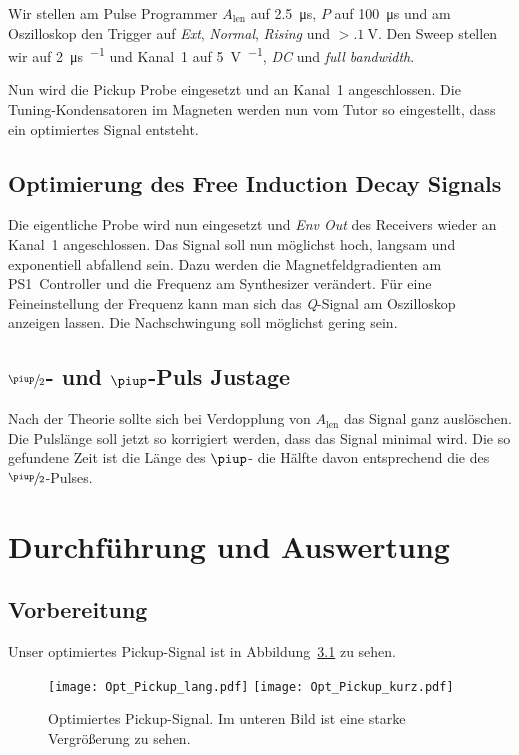 Wir stellen am Pulse Programmer $A_\text{len}$ auf \SI{2.5}{\micro\second}, $P$
auf \SI{100}{\micro\second} und am Oszilloskop den Trigger auf \emph{Ext},
\emph{Normal}, \emph{Rising} und $> \SI{.1}{\volt}$. Den Sweep stellen wir auf
\SI{2}{\micro\second\per\division} und Kanal~1 auf \SI{5}{\volt\per\division},
\emph{DC} und \emph{full bandwidth}.

Nun wird die Pickup Probe eingesetzt und an Kanal~1 angeschlossen. Die
Tuning-Kondensatoren im Magneten werden nun vom Tutor so eingestellt, dass ein
optimiertes Signal entsteht.

\section{Optimierung des Free Induction Decay Signals}

Die eigentliche Probe wird nun eingesetzt und \emph{Env Out} des Receivers
wieder an Kanal~1 angeschlossen. Das Signal soll nun möglichst hoch, langsam
und exponentiell abfallend sein. Dazu werden die Magnetfeldgradienten am
PS1~Controller und die Frequenz am Synthesizer verändert. Für eine
Feineinstellung der Frequenz kann man sich das \emph{Q}-Signal am Oszilloskop
anzeigen lassen. Die Nachschwingung soll möglichst gering sein.

\section{$\sfrac\piup2$- und $\piup$-Puls Justage}

Nach der Theorie sollte sich bei Verdopplung von $A_\text{len}$ das Signal
ganz auslöschen. Die Pulslänge soll jetzt so korrigiert werden, dass das
Signal minimal wird. Die so gefundene Zeit ist die Länge des $\piup$- die
Hälfte davon entsprechend die des $\sfrac{\piup}{2}$-Pulses.

\chapter{Durchführung und Auswertung}

\section{Vorbereitung}

Unser optimiertes Pickup-Signal ist in Abbildung~\ref{fig:pickup}
zu sehen.

\begin{figure}
    \centering
    \texttt{[image: Opt\_Pickup\_lang.pdf]}
    \texttt{[image: Opt\_Pickup\_kurz.pdf]}
    \caption{%
    Optimiertes Pickup-Signal. Im unteren Bild ist eine starke Vergrößerung zu
    sehen.
    }
    \label{fig:pickup}
\end{figure}

